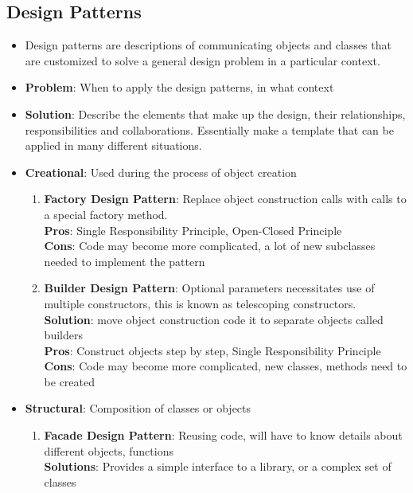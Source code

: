 \documentclass[a4paper]{article}
\begin{document}
\subsection{Design Patterns}
\begin{itemize}
    \item Design patterns are descriptions of communicating objects and classes that are customized to solve a general design problem in a particular context. 
    \item \textbf{Problem}: When to apply the design patterns, in what context
    \item \textbf{Solution}: Describe the elements that make up the design, their relationships, responsibilities and collaborations. Essentially make a template that can be applied in many different situations.
    \item \textbf{Creational}: Used during the process of object creation
    \begin{enumerate}
        \item \textbf{Factory Design Pattern}: Replace object construction calls with calls to a special factory method.\\
        \textbf{Pros}: Single Responsibility Principle, Open-Closed Principle\\
        \textbf{Cons}: Code may become more complicated, a lot of new subclasses needed to implement the pattern
        \item \textbf{Builder Design Pattern}: Optional parameters necessitates use of multiple constructors, this is known as telescoping constructors.\\
        \textbf{Solution}: move object construction code it to separate objects called builders\\
        \textbf{Pros}: Construct objects step by step, Single Responsibility Principle\\
        \textbf{Cons}: Code may become more complicated, new classes, methods need to be created
    \end{enumerate}
    \pagebreak
    \item \textbf{Structural}: Composition of classes or objects
    \begin{enumerate}
        \item \textbf{Facade Design Pattern}: Reusing code, will have to know details about different objects, functions\\
        \textbf{Solutions}: Provides a simple interface to a library, or a complex set of classes\\

\end{enumerate}
\end{itemize}
\end{document}
